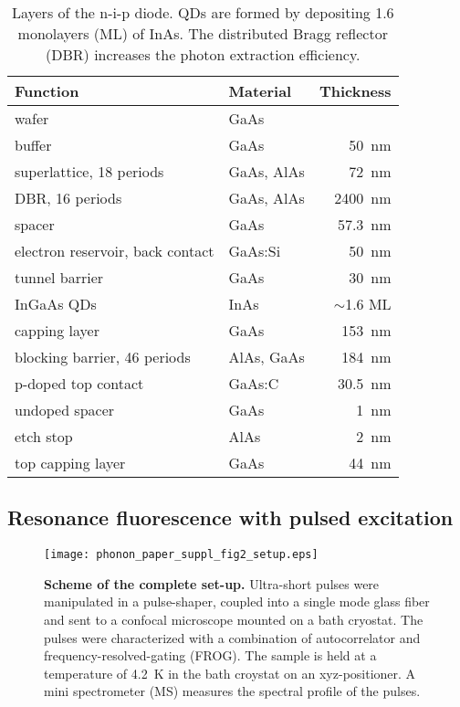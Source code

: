 \documentclass[aps,prl,reprint,superscriptaddress]{revtex4-1}
\begin{document}
\begin{table}[t]
	\begin{tabular}{llr}
	\hline \hline
	Function & Material & Thickness \\ \hline
	wafer & GaAs &\\
	buffer & GaAs & \SI{50}{\nano\meter}\\
	superlattice, 18 periods & GaAs, AlAs & \SI{72}{\nano\meter}\\
	DBR, 16 periods & GaAs, AlAs & \SI{2400}{\nano\meter}\\
	spacer & GaAs & \SI{57.3}{\nano\meter}\\
	electron reservoir, back contact & GaAs:Si & \SI{50}{\nano\meter}\\
	tunnel barrier & GaAs & \SI{30}{\nano\meter}\\
	InGaAs QDs & InAs & $\sim$1.6 ML\\
	capping layer & GaAs & \SI{153}{\nano\meter}\\
	blocking barrier, 46 periods & AlAs, GaAs & \SI{184}{\nano\meter}\\
	p-doped top contact & GaAs:C & \SI{30.5}{\nano\meter}\\
	undoped spacer & GaAs & \SI{1}{\nano\meter}\\
	etch stop & AlAs & \SI{2}{\nano\meter}\\
	top capping layer & GaAs & \SI{44}{\nano\meter}\\
		\hline \hline
	\end{tabular}
	\caption{Layers of the n-i-p diode. QDs are formed by depositing 1.6 monolayers (ML) of InAs. The distributed Bragg reflector (DBR) increases the photon extraction efficiency.}
	\label{tab:nip}
\end{table}



\subsection{Resonance fluorescence with pulsed excitation}

\begin{figure}[b]{}
	\centering
	\texttt{[image: phonon\_paper\_suppl\_fig2\_setup.eps]}
	\caption{
	\textbf{Scheme of the complete set-up.} Ultra-short pulses were manipulated in a pulse-shaper, coupled into a single mode glass fiber and sent to a confocal microscope mounted on a bath cryostat. The pulses were characterized with a combination of autocorrelator and frequency-resolved-gating (FROG). The sample is held at a temperature of \SI{4.2}{\kelvin} in the bath croystat on an xyz-positioner. A mini spectrometer (MS) measures the spectral profile of the pulses.
	}
	\label{fig:sfig2}
\end{figure}
\end{document}
